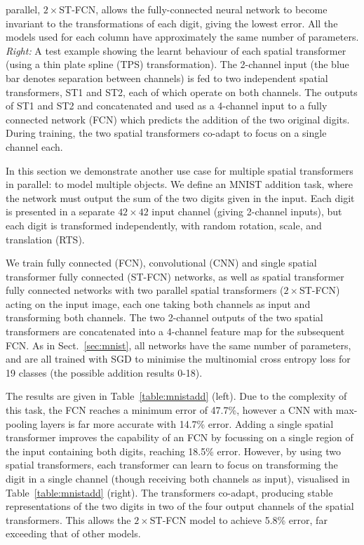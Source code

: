 \documentclass{article} %
\newcommand{\tblref}[1]{Table~\ref{#1}}
\newcommand{\sref}[1]{Sect.~\ref{#1}}
\begin{document}
\begin{appendices}
\begin{table}[t]
{parallel, $2\times$ST-FCN, allows the fully-connected neural network to become
invariant to the transformations of each digit, giving the lowest error. All the
models used for each column have approximately the same number of parameters. \emph{Right:} A test example showing the learnt behaviour of each spatial transformer (using a thin plate spline (TPS) transformation). The 2-channel input (the blue bar denotes separation between channels) is fed to two independent spatial transformers, ST1 and ST2, each of which operate on both channels. The outputs of ST1 and ST2 and concatenated and used as a 4-channel input to a fully connected network (FCN) which predicts the addition of the two original digits. During training, the two spatial transformers co-adapt to focus on a single channel each.}
\label{table:mnistadd}
\end{table}

In this section we demonstrate another use case for multiple spatial transformers in parallel: to model multiple objects. We define an MNIST addition task, where the network must output the sum of the two digits given in the input. Each digit is presented in a separate $42\times 42$ input channel (giving 2-channel inputs), but each digit is transformed independently, with random rotation, scale, and translation (RTS). 

We train fully connected (FCN), convolutional (CNN) and single spatial transformer fully connected (ST-FCN) networks, as well as spatial transformer fully connected networks with two parallel spatial transformers ($2\times$ST-FCN) acting on the input image, each one taking both channels as input and transforming both channels. The two 2-channel outputs of the two spatial transformers are concatenated into a 4-channel feature map for the subsequent FCN. As in \sref{sec:mnist}, all networks have the same number of parameters, and are all trained with SGD to minimise the multinomial cross entropy loss for 19 classes (the possible addition results 0-18).

The results are given in \tblref{table:mnistadd} (left). Due to the complexity of this task, the FCN reaches a minimum error of 47.7\%, however a CNN with max-pooling layers is far more accurate with 14.7\% error. Adding a single spatial transformer improves the capability of an FCN by focussing on a single region of the input containing both digits, reaching 18.5\% error. However, by using two spatial transformers, each transformer can learn to focus on transforming the digit in a single channel (though receiving both channels as input), visualised in \tblref{table:mnistadd} (right). The transformers co-adapt, producing stable representations of the two digits in two of the four output channels of the spatial transformers. This allows the $2\times$ST-FCN model to achieve 5.8\% error, far exceeding that of other models.



\end{appendices}
\end{document}

